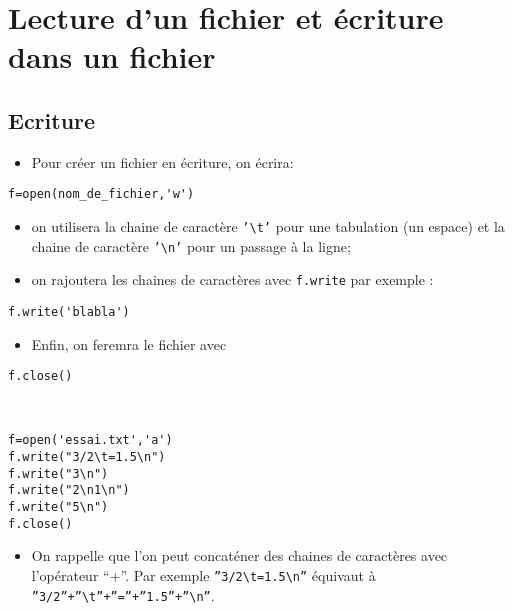 \def\t{\textbackslash t}
\def\n{\textbackslash n}

\section*{Lecture d'un fichier et écriture dans un fichier}
	
\subsection*{Ecriture}

\begin{itemize}
\item Pour créer un fichier en écriture, on écrira:
\end{itemize}

\begin{lstlisting}
f=open(nom_de_fichier,'w')
\end{lstlisting}

\begin{itemize}
\item on utilisera la chaine de caractère \texttt{'\t'} pour une tabulation (un espace) et la chaine de caractère \texttt{'\n'} pour un passage à la ligne;
\item on rajoutera les chaines de caractères avec \texttt{f.write} par exemple :
\end{itemize}

\begin{lstlisting}
f.write('blabla')
\end{lstlisting}

\begin{itemize}
\item Enfin, on feremra le fichier avec 
\end{itemize}

\begin{lstlisting}
f.close()
\end{lstlisting}


\begin{exemple}~\\
\begin{lstlisting}
f=open('essai.txt','a')
f.write("3/2\t=1.5\n")
f.write("3\n")
f.write("2\n1\n")
f.write("5\n")
f.close()
\end{lstlisting}
\end{exemple}

\begin{itemize}
\item On rappelle que l'on peut concaténer des chaines de caractères avec l'opérateur “+”. Par exemple \texttt{''3/2\t=1.5\n''} équivaut à \texttt{''3/2''+''\t''+''=''+''1.5''+''\n''}.
\end{itemize}

